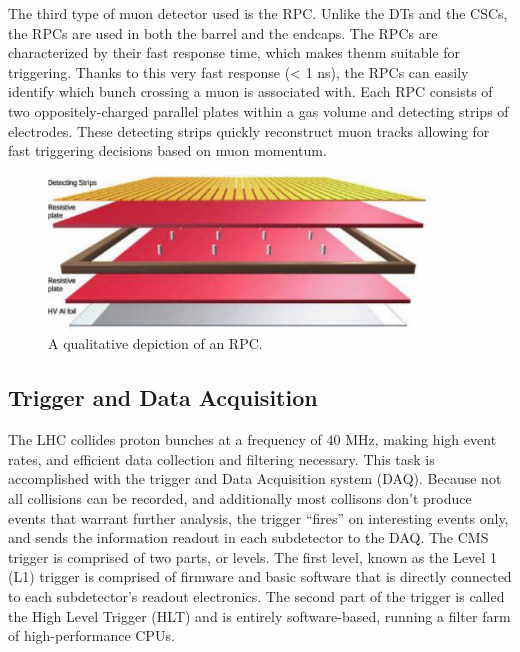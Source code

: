 The third type of muon detector used is the RPC. Unlike the DTs and the CSCs, the RPCs are used in both the barrel and the endcaps. The RPCs are characterized by their fast response time, which makes thenm suitable for triggering. Thanks to this very fast response (< 1 ns), the RPCs can easily identify which bunch crossing a muon is associated with. 
Each RPC consists of two oppositely-charged parallel plates within a gas volume and detecting strips of electrodes. These detecting strips quickly reconstruct muon tracks allowing for fast triggering decisions based on muon momentum.  

\begin{figure}[hbtp]
 \begin{center}
   \includegraphics[width=0.9\textwidth]{ch3_figs/cms_rpc.pdf}
   \caption{A qualitative depiction of an RPC.}
   \label{fig:cms_rpc}
 \end{center}
\end{figure}
 
\subsection{Trigger and Data Acquisition}

The LHC collides proton bunches at a frequency of 40 MHz, making high event rates, and efficient data collection and filtering necessary. This task is accomplished with the trigger and Data Acquisition system (DAQ). Because not all collisions can be recorded,
and additionally most collisons don't produce events that warrant further analysis, the trigger ``fires'' on interesting events only, and sends the information readout in each subdetector to the DAQ. The CMS trigger is comprised of two parts, or levels.
The first level, known as the Level 1 (L1) trigger is comprised of firmware and basic software that is directly connected to each subdetector's readout electronics. The second part of the trigger is called the High Level Trigger (HLT) and is entirely software-based,
running a filter farm of high-performance CPUs. 

